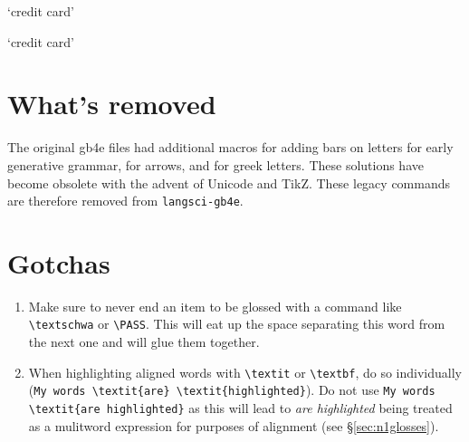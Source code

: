 \documentclass[output=paper]{langscibook}
\newcommand{\cmd}[1]{\texttt{\textbackslash#1}}
\begin{document}
\begin{exe} 
\glt `credit card'

\glt `credit card'
\end{exe} 




\section{What's removed}
The original gb4e files had additional macros for adding bars on letters for early generative grammar, for arrows, and for greek letters. These solutions have become obsolete with the advent of Unicode and TikZ. These legacy commands are therefore removed from \texttt{langsci-gb4e}.

\section{Gotchas}
\begin{enumerate}
\item Make sure to never end an item to be glossed with a command like \cmd{textschwa} or \cmd{PASS}. This will eat up the space separating this word from the next one and will glue them together. 
\item When highlighting aligned words with \cmd{textit} or \cmd{textbf}, do so individually (\verb+My words \textit{are} \textit{highlighted}+). Do not use \verb+My words+ \verb+\textit{are highlighted}+ as this will lead to \textit{are highlighted} being treated as a mulitword expression for purposes of alignment (see §\ref{sec:n1glosses}).
\end{enumerate}
 
\end{document}
